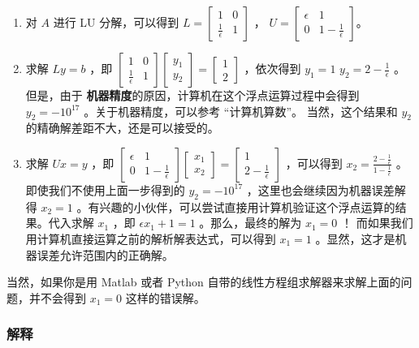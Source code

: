 \begin{enumerate}
\item 对  $A$  进行 LU 分解，可以得到  $L=\begin{bmatrix} 1& 0\\ \frac{1}{\epsilon} & 1 \end{bmatrix}$  ，  $U=\begin{bmatrix} \epsilon & 1\\ 0 & 1-\frac{1}{\epsilon} \end{bmatrix}$。
\item  求解  $Ly=b$  ，即  $\begin{bmatrix} 1& 0\\ \frac{1}{\epsilon} & 1 \end{bmatrix} \begin{bmatrix} y_1\\ y_2 \end{bmatrix}= \begin{bmatrix} 1\\ 2 \end{bmatrix}$  ，依次得到  $y_1=1$   $y_2=2-\frac{1}{\epsilon}$  。但是，由于	\textbf{机器精度}的原因，计算机在这个浮点运算过程中会得到  $y_2=-10^{17}$  。关于机器精度，可以参考 “计算机算数”。 当然，这个结果和  $y_2$  的精确解差距不大，还是可以接受的。
\item 求解  $Ux=y$  ，即  $\begin{bmatrix} \epsilon& 1\\ 0 &1-\frac{1}{\epsilon}  \end{bmatrix} \begin{bmatrix} x_1\\ x_2 \end{bmatrix}= \begin{bmatrix} 1\\ 2-\frac{1}{\epsilon} \end{bmatrix}$  ，可以得到  $x_2=\frac{2-\frac{1}{\epsilon}}{1-\frac{1}{\epsilon}}$  。即使我们不使用上面一步得到的  $y_2=-10^{17}$  ，这里也会继续因为机器误差解得  $x_2=1$  。有兴趣的小伙伴，可以尝试直接用计算机验证这个浮点运算的结果。代入求解  $x_1$  ，即  $\epsilon x_1+1=1$  。那么，最终的解为  $x_1=0$ ！ 而如果我们用计算机直接运算之前的解析解表达式，可以得到  $x_1=1$  。显然，这才是机器误差允许范围内的正确解。
\end{enumerate}

当然，如果你是用 Matlab 或者 Python 自带的线性方程组求解器来求解上面的问题，并不会得到  $x_1=0$  这样的错误解。

\subsubsection{解释}

